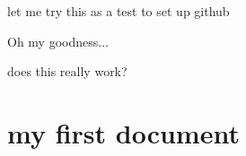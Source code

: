 let me try this as a test to set up github


Oh my goodness...

does this really work?

\section{my first document}
